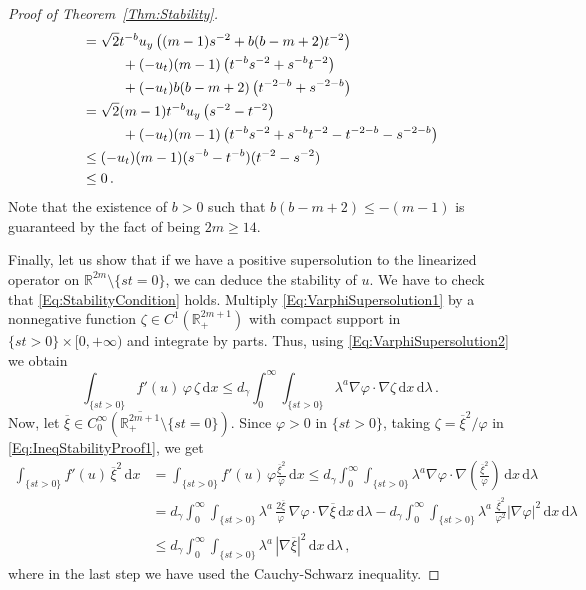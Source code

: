 \documentclass[12pt,reqno]{amsart}
\theoremstyle{definition}
\theoremstyle{remark}
\newcommand{\con}[1]{\mathbb{#1}}
\newcommand{\R}{\con{R}} %
\newcommand{\s}{\gamma}
\renewcommand{\d}{\,\mathrm{d}} %
\numberwithin{equation}{section}
\begin{document}
\begin{proof}[Proof of Theorem~\ref{Thm:Stability}]
\begin{align*}
&= \sqrt{2} t^{-b} u_y \left( (m-1) s^{-2} + b(b-m+2) t^{-2}\right) \\
& \hspace{10mm} + (-u_t) (m-1) \left( t^{-b} s^{-2} + s^{-b} t^{-2} \right) \\
& \hspace{10mm} + (-u_t) b (b-m+2) \left( t^{-2-b} + s^{-2-b} \right) \\
&= \sqrt{2} (m-1) t^{-b} u_y \left( s^{-2} - t^{-2}\right) \\
& \hspace{10mm} + (-u_t) (m-1) \left( t^{-b} s^{-2} + s^{-b} t^{-2} - t^{-2-b} - s^{-2-b} \right) \\
& \leq (-u_t) (m-1) (s^{-b}-t^{-b}) (t^{-2}-s^{-2}) \\
& \leq 0\,.
\end{align*}
Note that the existence of $b>0$ such that $b(b-m+2)\leq -(m-1)$ is guaranteed by the fact of being $2m\geq 14$.




Finally, let us show that if we have a positive supersolution to the linearized operator on $\R^{2m}\setminus \{st=0\}$, we can deduce the stability of $u$. We have to check that \eqref{Eq:StabilityCondition} holds. Multiply \eqref{Eq:VarphiSupersolution1} by a nonnegative function $\zeta\in C^1(\R^{2m+1}_+)$ with compact support in $\{st>0\}\times [0,+\infty)$ and integrate by parts. Thus, using \eqref{Eq:VarphiSupersolution2} we obtain
\begin{equation}
	\label{Eq:IneqStabilityProof1}	
	\int_{\{st>0\}} f'(u) \, \varphi \, \zeta  \d x \leq d_\s \int_0^\infty \int_{\{st>0\}} \lambda^a \nabla{\varphi} \cdot \nabla{\zeta}  \d x \d \lambda\,.
\end{equation}
Now, let $\overline{\xi} \in C^\infty_0(\overline{\R^{2m+1}_+}\setminus \{st=0\})$. Since $\varphi > 0$ in $\{st>0\}$, taking $\zeta = \overline{\xi}^2/\varphi$ in \eqref{Eq:IneqStabilityProof1}, we get
\begin{align*}
\int_{\{st>0\}}  \! f'(u)\,\overline{\xi}^2 \d x &= \int_{\{st>0\}} \! f'(u)\,\varphi \frac{\overline{\xi}^2}{\varphi} \d x \leq d_\s \int_0^\infty \! \!  \int_{\{st>0\}} \! \lambda^a \nabla{\varphi} \cdot \nabla{\left(\frac{\overline{\xi}^2}{\varphi}\right)} \d x \d \lambda \\
&= d_\s \int_0^\infty \! \! \int_{\{st>0\}}\!  \lambda^a\,\frac{2\overline{\xi}}{\varphi} \,\nabla \varphi\cdot \nabla \overline{\xi}  \d x \d \lambda - d_\s \int_0^\infty \! \!  \int_{\{st>0\}} \!  \lambda^a\,\frac{\overline{\xi}^2}{\varphi^2}|\nabla \varphi|^2  \d x \d \lambda \\
&\leq d_\s \int_0^\infty \! \! \int_{\{st>0\}} \! \lambda^a\,|\nabla \overline{\xi}|^2  \d x \d \lambda\,,
\end{align*}
where in the last step we have used the Cauchy-Schwarz inequality.


\end{proof}
\end{document}
